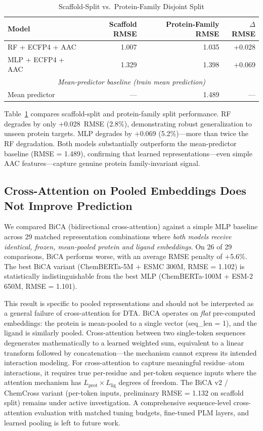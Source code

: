 \documentclass[pmlr,twocolumn]{jmlr}
\begin{document}
\begin{table}[t]
\centering
\small
\caption{Scaffold-Split vs.\ Protein-Family Disjoint Split}
\label{tab:protein_split}
\begin{tabular}{lrrr}
\toprule
\textbf{Model} & \textbf{Scaffold RMSE} & \textbf{Protein-Family RMSE} & $\Delta$\textbf{RMSE} \\
\midrule
RF + ECFP4 + AAC       & 1.007 & 1.035 & +0.028 \\
MLP + ECFP4 + AAC      & 1.329 & 1.398 & +0.069 \\
\midrule
\multicolumn{4}{c}{\textit{Mean-predictor baseline (train mean prediction)}} \\
Mean predictor         & ---   & 1.489 & --- \\
\bottomrule
\end{tabular}
\end{table}

Table~\ref{tab:protein_split} compares scaffold-split and protein-family split performance. RF degrades by only $+$0.028~RMSE (2.8\%), demonstrating robust generalization to unseen protein targets. MLP degrades by $+$0.069 (5.2\%)---more than twice the RF degradation. Both models substantially outperform the mean-predictor baseline (RMSE = 1.489), confirming that learned representations---even simple AAC features---capture genuine protein family-invariant signal.

\subsection{Cross-Attention on Pooled Embeddings Does Not Improve Prediction}
\label{sec:chemcross}

We compared BiCA (bidirectional cross-attention) against a simple MLP baseline across 29 matched representation combinations where \emph{both models receive identical, frozen, mean-pooled protein and ligand embeddings}. On 26 of 29 comparisons, BiCA performs worse, with an average RMSE penalty of $+$5.6\%. The best BiCA variant (ChemBERTa-5M + ESMC 300M, RMSE = 1.102) is statistically indistinguishable from the best MLP (ChemBERTa-100M + ESM-2 650M, RMSE = 1.101).

This result is specific to pooled representations and should not be interpreted as a general failure of cross-attention for DTA. BiCA operates on \emph{flat} pre-computed embeddings: the protein is mean-pooled to a single vector (seq\_len = 1), and the ligand is similarly pooled. Cross-attention between two single-token sequences degenerates mathematically to a learned weighted sum, equivalent to a linear transform followed by concatenation---the mechanism cannot express its intended interaction modeling. For cross-attention to capture meaningful residue--atom interactions, it requires true per-residue and per-token sequence inputs where the attention mechanism has $L_\text{prot} \times L_\text{lig}$ degrees of freedom. The BiCA v2 / ChemCross variant (per-token inputs, preliminary RMSE = 1.132 on scaffold split) remains under active investigation. A comprehensive sequence-level cross-attention evaluation with matched tuning budgets, fine-tuned PLM layers, and learned pooling is left to future work.
\end{document}
